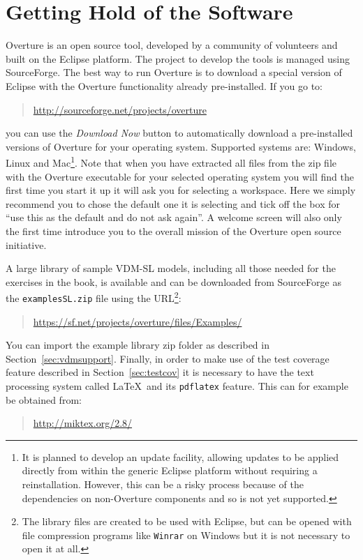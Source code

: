 {\section{Getting Hold of the Software}\label{sec:install}

Overture is an open source tool, developed by a community of
volunteers and built on the Eclipse platform. The project to develop
the tools is managed using SourceForge.  The best way to run Overture
is to download a special version of Eclipse with the Overture
functionality already pre-installed. If you go to: 
  \begin{quote}
  \url{http://sourceforge.net/projects/overture}
  \end{quote}
  \noindent you can use the \textit{Download Now} button to
  automatically download a pre-installed versions of Overture for your
  operating system.  Supported systems are: Windows, Linux and
  Mac\footnote{It is planned to develop an update facility, allowing
    updates to be applied directly from within the generic Eclipse
    platform without requiring a reinstallation. However, this can be
    a risky process because of the dependencies on non-Overture
    components and so is not yet supported.}.
Note that when you have extracted all files from the zip file with the
Overture executable for your selected operating system you will find
the first time you start it up it will ask you for selecting a
workspace. Here we simply recommend you to chose the default one it is
selecting and tick off the box for ``use this as the default and do
not ask again''. A welcome screen will also only the first time
introduce you to the overall mission of the Overture open source
initiative. 

A large library of sample VDM-SL models, including all those needed
for the exercises in the book, is available and can be downloaded from
SourceForge as the \texttt{examplesSL.zip} file using the
URL\footnote{The library files are created to be used with Eclipse,
  but can be opened with file compression programs like \texttt{Winrar} on
  Windows but it is not necessary to open it at all.}: 
\begin{quote}
\url{https://sf.net/projects/overture/files/Examples/}
\end{quote}
You can import the example library zip folder as described in
Section~\ref{sec:vdmsupport}.  Finally, in order to make use of the
test coverage feature described in Section~\ref{sec:testcov} it is
necessary to have the text processing system called \LaTeX\ and its
\texttt{pdflatex} feature. This can for example be obtained from:
\begin{quote}
\url{http://miktex.org/2.8/}
\end{quote}

}
